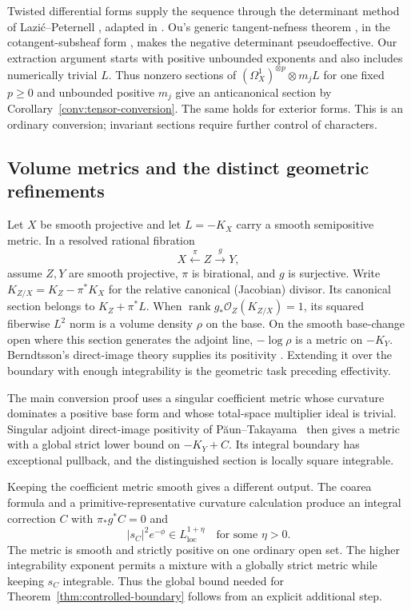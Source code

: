 Twisted differential forms supply the sequence through the determinant
method of Lazi\'c--Peternell \cite[Lemma~4.1]{LP2018}, adapted in
\cite[Lemma~5.1]{LMPTX2023}.  Ou's generic tangent-nefness theorem
\cite[Theorem~1.4]{Ou2023}, in the cotangent-subsheaf form
\cite[Theorem~4.1]{LMPTX2023}, makes the negative determinant
pseudoeffective.  Our extraction argument starts with positive
unbounded exponents and also includes numerically trivial $L$.
Thus nonzero sections of $(\Omega_X^1)^{\otimes p}\otimes m_jL$
for one fixed $p\ge0$ and unbounded positive $m_j$ give an
anticanonical section by Corollary~\ref{conv:tensor-conversion}.
The same holds for exterior forms.  This is an ordinary conversion;
invariant sections require further control of characters.

\subsection{Volume metrics and the distinct geometric refinements}

Let $X$ be smooth projective and let $L=-K_X$ carry a smooth
semipositive metric.  In a resolved rational fibration
\[
 X\xleftarrow{\ \pi\ } Z\xrightarrow{\ g\ }Y,
\]
assume $Z,Y$ are smooth projective, $\pi$ is birational, and $g$ is
surjective.  Write $K_{Z/X}=K_Z-\pi^*K_X$ for the relative canonical
(Jacobian) divisor.  Its canonical section belongs to $K_Z+\pi^*L$.
When
$\operatorname{rank}g_*\mathcal O_Z(K_{Z/X})=1$, its squared fiberwise
$L^2$ norm is a volume density $\rho$ on the base.  On the smooth
base-change open where this section generates the adjoint line,
$-\log\rho$ is a metric on $-K_Y$.
Berndtsson's direct-image theory supplies its positivity
\cite{Berndtsson2009,Berndtsson2011}.  Extending it over the boundary
with enough integrability is the geometric task preceding effectivity.

The main conversion proof uses a singular coefficient metric whose
curvature dominates a positive base form and whose total-space
multiplier ideal is trivial.  Singular adjoint direct-image positivity
of P\u aun--Takayama~\cite{PT2018} then gives a metric with a global
strict lower bound on $-K_Y+C$.  Its integral boundary has exceptional
pullback, and the distinguished section is locally square integrable.

Keeping the coefficient metric smooth gives a different output.
The coarea formula and a primitive-representative curvature calculation
produce an integral correction $C$ with $\pi_*g^*C=0$ and
\[
 |s_C|^2e^{-\phi}\in L^{1+\eta}_{\mathrm{loc}}
 \quad\text{for some }\eta>0.
\]
The metric is smooth and strictly positive on one ordinary open set.
The higher integrability exponent permits a mixture with a globally
strict metric while keeping $s_C$ integrable.  Thus the global bound
needed for Theorem~\ref{thm:controlled-boundary} follows from an
explicit additional step.

